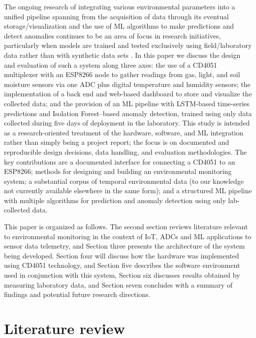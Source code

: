 \documentclass[journal,onecolumn]{IEEEtran}
\begin{document}
The ongoing research of integrating various environmental parameters into a unified pipeline spanning from the acquisition of data through its eventual storage/visualization and the use of ML algorithms to make predictions and detect anomalies continues to be an area of focus in research initiatives, particularly when models are trained and tested exclusively using field/laboratory data rather than with synthetic data sets \cite{labmonitoring2020}. In this paper we discuss the design and evaluation of such a system along three axes: the use of a CD4051 multiplexer with an ESP8266 node to gather readings from gas, light, and soil moisture sensors via one ADC plus digital temperature and humidity sensors; the implementation of a back end and web-based dashboard to store and visualize the collected data; and the provision of an ML pipeline with LSTM-based time-series predictions and Isolation Forest--based anomaly detection, trained using only data collected during five days of deployment in the laboratory. This study is intended as a research-oriented treatment of the hardware, software, and ML integration rather than simply being a project report; the focus is on documented and reproducible design decisions, data handling, and evaluation methodologies. The key contributions are a documented interface for connecting a CD4051 to an ESP8266; methods for designing and building an environmental monitoring system; a substantial corpus of temporal environmental data (to our knowledge not currently available elsewhere in the same form); and a structured ML pipeline with multiple algorithms for prediction and anomaly detection using only lab-collected data.

This paper is organized as follows. The second section reviews literature relevant to environmental monitoring in the context of IoT, ADCs and ML applications to sensor data telemetry, and Section three presents the architecture of the system being developed. Section four will discuss how the hardware was implemented using CD4051 technology, and Section five describes the software environment used in conjunction with this system, Section six discusses results obtained by measuring laboratory data, and Section seven concludes with a summary of findings and potential future research directions.
\section{Literature review}
\end{document}
